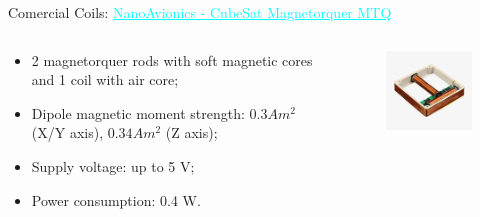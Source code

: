\begin{frame}{Comercial Coils: \href{https://nanoavionics.com/cubesat-components/cubesat-magnetorquer-satbus-mtq/}{\textcolor{cyan}{\underline{NanoAvionics - CubeSat Magnetorquer MTQ}}}}

    \begin{columns}[t]
        \begin{column}[t]{0.5\textwidth}
            \begin{itemize}
                \item 2 magnetorquer rods with soft magnetic cores and 1 coil with air core;
                \item Dipole magnetic moment strength: $0.3 Am^2$ (X/Y axis), $0.34 Am^2$ (Z axis);
                \item Supply voltage: up to 5 V;
                \item Power consumption: 0.4 W.
            \end{itemize}
        \end{column}
        \begin{column}[t]{0.5\textwidth}
            \begin{figure}[!ht]
                \begin{center}
                    \includegraphics[width=4.5cm]{figures/magnetorquers-nanoavionics.png}
                \end{center}
            \end{figure}
        \end{column}
    \end{columns}
    
\end{frame}